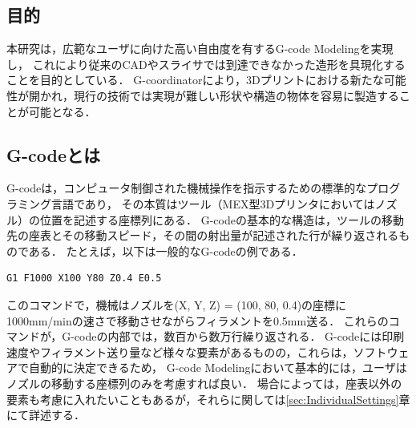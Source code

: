\documentclass{article}
\begin{document}
\begin{twocolumn}
\subsection{目的}
本研究は，広範なユーザに向けた高い自由度を有するG-code Modelingを実現し，
これにより従来のCADやスライサでは到達できなかった造形を具現化することを目的としている．
G-coordinatorにより，3Dプリントにおける新たな可能性が開かれ，現行の技術では実現が難しい形状や構造の物体を容易に製造することが可能となる．

\subsection{G-codeとは}
\label{sec:WhatIsGcode}
G-codeは，コンピュータ制御された機械操作を指示するための標準的なプログラミング言語であり，
その本質はツール（MEX型3Dプリンタにおいてはノズル）の位置を記述する座標列にある．
G-codeの基本的な構造は，ツールの移動先の座表とその移動スピード，その間の射出量が記述された行が繰り返されるものである．
たとえば，以下は一般的なG-codeの例である．
\begin{verbatim}
G1 F1000 X100 Y80 Z0.4 E0.5 
\end{verbatim}
このコマンドで，機械はノズルを(X, Y, Z) = (100, 80, 0.4)の座標に1000mm/minの速さで移動させながらフィラメントを0.5mm送る．
これらのコマンドが，G-codeの内部では，数百から数万行繰り返される．
G-codeには印刷速度やフィラメント送り量など様々な要素があるものの，これらは，ソフトウェアで自動的に決定できるため，
G-code Modelingにおいて基本的には，ユーザはノズルの移動する座標列のみを考慮すれば良い．
場合によっては，座表以外の要素も考慮に入れたいこともあるが，それらに関しては\ref{sec:IndividualSettings}章にて詳述する．


\end{twocolumn}
\end{document}
